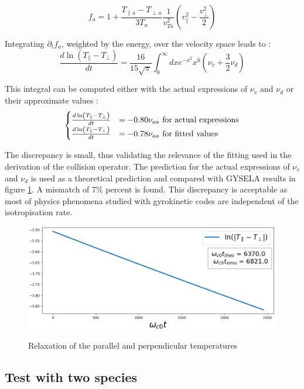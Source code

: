 \documentclass[11pt,preprint]{elsarticle}
\begin{document}
\[
f_{a}=1+\frac{T_{\parallel a}-T_{\perp a}}{3T_{a}}\frac{1}{v_{Ta}^{2}}\left(v_{\parallel}^{2}-\frac{v_{\perp}^{2}}{2}\right)
\]


Integrating $\partial_{t}f_{a}$, weighted by the energy, over the
velocity space leads to :
\[
\frac{d\ln\left(T_{\parallel}-T_{\perp}\right)}{dt}=\frac{16}{15\sqrt{\pi}}\int_{0}^{\infty}dxe^{-x^{2}}x^{\text{6}}\left(\nu_{v}+\frac{3}{2}\nu_{d}\right)
\]


This integral can be computed either with the actual expressions of
$\nu_{v}$ and $\nu_{d}$ or their approximate values :
\[
\begin{cases}
\frac{d\ln\left(T_{\parallel}-T_{\perp}\right)}{dt} & =-0.80\nu_{aa}\mbox{\text{ for actual expressions}}\\
\frac{d\ln\left(T_{\parallel}-T_{\perp}\right)}{dt} & =-0.78\nu_{aa}\mbox{\text{ for fitted values}}
\end{cases}
\]


The discrepancy is small, thus validating the relevance of the fitting used in the derivation of the collision operator.
The prediction for the actual expressions of $\nu_{v}$ and $\nu_{d}$ is used as a theoretical prediction and compared with GYSELA results in figure \ref{fig: isotropisation}. A mismatch of 7\% percent is found. This discrepancy is acceptable as most of physics phenomena studied with gyrokinetic codes are independent of the isotropisation rate. 

\begin{figure}[H]
\caption{Relaxation of the parallel and perpendicular temperatures\label{fig:Time-evolution-of-Tpar-Tperp}}
\centering{}\includegraphics[scale=0.8]{Figures/isotropisation.PNG}
\label{fig: isotropisation}
\end{figure}


\subsection{Test with two species}
\end{document}
